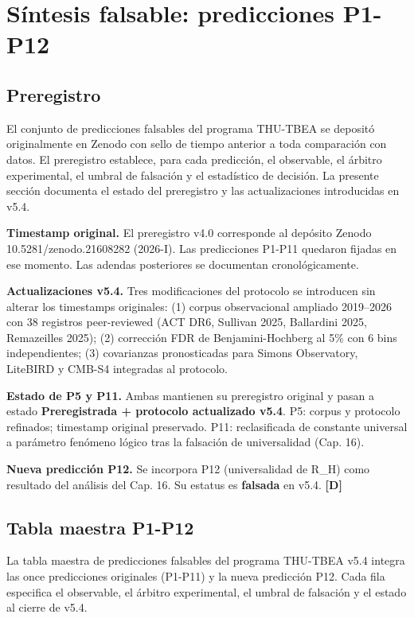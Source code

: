 ﻿\documentclass[11pt,letterpaper]{article}
\begin{document}
\section{Síntesis falsable: predicciones P1-P12}
\subsection{Preregistro}
El conjunto de predicciones falsables del programa THU-TBEA se depositó originalmente en Zenodo con sello de tiempo anterior a toda comparación con datos. El preregistro establece, para cada predicción, el observable, el árbitro experimental, el umbral de falsación y el estadístico de decisión. La presente sección documenta el estado del preregistro y las actualizaciones introducidas en v5.4.

\textbf{Timestamp original.} El preregistro v4.0 corresponde al depósito Zenodo 10.5281/zenodo.21608282 (2026-I). Las predicciones P1-P11 quedaron fijadas en ese momento. Las adendas posteriores se documentan cronológicamente.

\textbf{Actualizaciones v5.4.} Tres modificaciones del protocolo se introducen sin alterar los timestamps originales: (1) corpus observacional ampliado 2019--2026 con 38 registros peer-reviewed (ACT DR6, Sullivan 2025, Ballardini 2025, Remazeilles 2025); (2) corrección FDR de Benjamini-Hochberg al 5\% con 6 bins independientes; (3) covarianzas pronosticadas para Simons Observatory, LiteBIRD y CMB-S4 integradas al protocolo.

\textbf{Estado de P5 y P11.} Ambas mantienen su preregistro original y pasan a estado \textbf{Preregistrada + protocolo actualizado v5.4}. P5: corpus y protocolo refinados; timestamp original preservado. P11: reclasificada de constante universal a parámetro fenómeno lógico tras la falsación de universalidad (Cap. 16).

\textbf{Nueva predicción P12.} Se incorpora P12 (universalidad de R\_H) como resultado del análisis del Cap. 16. Su estatus es \textbf{falsada} en v5.4. \textbf{[D]}
\subsection{Tabla maestra P1-P12}
La tabla maestra de predicciones falsables del programa THU-TBEA v5.4 integra las once predicciones originales (P1-P11) y la nueva predicción P12. Cada fila especifica el observable, el árbitro experimental, el umbral de falsación y el estado al cierre de v5.4.
\end{document}
